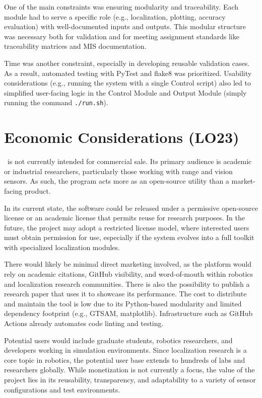 \documentclass{article}
\begin{document}
One of the main constraints was ensuring modularity and traceability. Each module had to serve a specific role (e.g., localization, plotting, accuracy evaluation) with well-documented inputs and outputs. This modular structure was necessary both for validation and for meeting assignment standards like traceability matrices and MIS documentation.

Time was another constraint, especially in developing reusable validation cases. As a result, automated testing with PyTest and flake8 was prioritized. Usability considerations (e.g., running the system with a single Control script) also led to simplified user-facing logic in the Control Module and Output Module (simply running the command \texttt{./run.sh}).

\section{Economic Considerations (LO23)}

\progname~is not currently intended for commercial sale. Its primary audience is academic or industrial researchers, particularly those working with range and vision sensors. As such, the program acts more as an open-source utility than a market-facing product.

In its current state, the software could be released under a permissive open-source license or an academic license that permits reuse for research purposes. In the future, the project may adopt a restricted license model, where interested users must obtain permission for use, especially if the system evolves into a full toolkit with specialized localization modules.

There would likely be minimal direct marketing involved, as the platform would rely on academic citations, GitHub visibility, and word-of-mouth within robotics and localization research communities. There is also the possibility to publish a research paper that uses it to showcase its performance. The cost to distribute and maintain the tool is low due to its Python-based modularity and limited dependency footprint (e.g., GTSAM, matplotlib). Infrastructure such as GitHub Actions already automates code linting and testing.

Potential users would include graduate students, robotics researchers, and developers working in simulation environments. Since localization research is a core topic in robotics, the potential user base extends to hundreds of labs and researchers globally. While monetization is not currently a focus, the value of the project lies in its reusability, transparency, and adaptability to a variety of sensor configurations and test environments.
\end{document}

